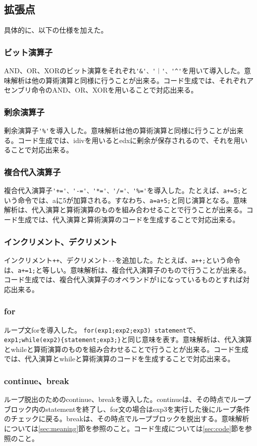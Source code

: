 \documentclass[titlepage, a4paper,12pt]{jarticle}
\begin{document}
\subsection{拡張点}
具体的に、以下の仕様を加えた。
\subsubsection{ビット演算子}
AND、OR、XORのビット演算をそれぞれ\verb|'&'、'｜'、'^'|を用いて導入した。意味解析は他の算術演算と同様に行うことが出来る。コード生成では、それぞれアセンブリ命令のAND、OR、XORを用いることで対応出来る。
\subsubsection{剰余演算子}
剰余演算子\verb|'%'|を導入した。意味解析は他の算術演算と同様に行うことが出来る。コード生成では、idivを用いるとedxに剰余が保存されるので、それを用いることで対応出来る。
\subsubsection{複合代入演算子}
複合代入演算子\verb|'+='、'-='、'*='、'/='、'%='|を導入した。たとえば、\verb|a+=5;|という命令では、aに5が加算される。すなわち、\verb|a=a+5;|と同じ演算となる。意味解析は、代入演算と算術演算のものを組み合わせることで行うことが出来る。コード生成では、代入演算と算術演算のコードを生成することで対応出来る。
\subsubsection{インクリメント、デクリメント}
インクリメント\verb|++|、デクリメント\verb|--|を追加した。たとえば、\verb|a++;|という命令は、\verb|a+=1;|と等しい。意味解析は、複合代入演算子のもので行うことが出来る。コード生成では、複合代入演算子のオペランドが1になっているものとすれば対応出来る。
\subsubsection{for}
ループ文forを導入した。
\verb|for(exp1;exp2;exp3) statement|で、\\ 
\verb|exp1;while(exp2){statement;exp3;}|と同じ意味を表す。意味解析は、代入演算とwhileと算術演算のものを組み合わせることで行うことが出来る。コード生成では、代入演算とwhileと算術演算のコードを生成することで対応出来る。
\subsubsection{continue、break}
ループ脱出のためのcontinue、breakを導入した。continueは、その時点でループブロック内のstatementを終了し、for文の場合はexp3を実行した後にループ条件のチェックに戻る。breakは、その時点でループブロックを脱出する。意味解析については\ref{sec:meaning}節を参照のこと。コード生成については\ref{sec:code}節を参照のこと。
\end{document}
